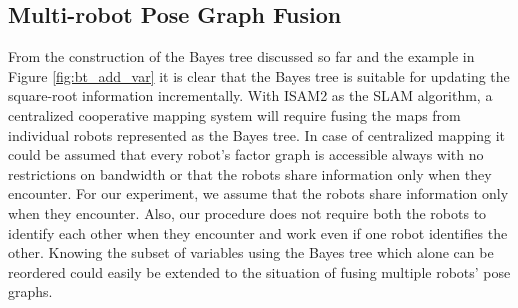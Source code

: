 \subsection{Multi-robot Pose Graph Fusion}
From the construction of the Bayes tree discussed so far and the example in Figure \ref{fig:bt_add_var} it is clear that the Bayes tree is suitable for updating the square-root information incrementally. With ISAM2 \cite{kaessisam2} as the SLAM algorithm, a centralized cooperative mapping system will require fusing the maps from individual robots represented as the Bayes tree. In case of centralized mapping it could be assumed that every robot's factor graph is accessible always with no restrictions on bandwidth or that the robots share information only when they encounter. For our experiment, we assume that the robots share information only when they encounter. Also, our procedure does not require both the robots to identify each other when they encounter and work even if one robot identifies the other. Knowing the subset of variables using the Bayes tree which alone can be reordered could easily be extended to the situation of fusing multiple robots' pose graphs. 
